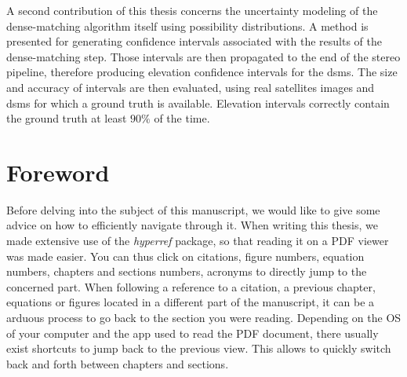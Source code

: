 A second contribution of this thesis concerns the uncertainty modeling of the dense-matching algorithm itself using possibility distributions. A method is presented for generating confidence intervals associated with the results of the dense-matching step. Those intervals are then propagated to the end of the stereo pipeline, therefore producing elevation confidence intervals for the \acrshort{dsm}s. The size and accuracy of intervals are then evaluated, using real satellites images and \acrshort{dsm}s for which a ground truth is available. Elevation intervals correctly contain the ground truth at least $90\%$ of the time.

\clearpage

\chapter*{Foreword}

Before delving into the subject of this manuscript, we would like to give some advice on how to efficiently navigate through it. When writing this thesis, we made extensive use of the \textit{hyperref} package, so that reading it on a PDF viewer was made easier. You can thus click on citations, figure numbers, equation numbers, chapters and sections numbers, acronyms \etc to directly jump to the concerned part. When following a reference to a citation, a previous chapter, equations or figures located in a different part of the manuscript, it can be a arduous process to go back to the section you were reading. Depending on the OS of your computer and the app used to read the PDF document, there usually exist shortcuts to jump back to the previous view. This allows to quickly switch back and forth between chapters and sections.

